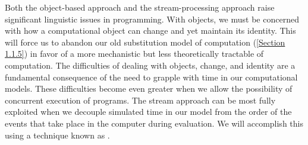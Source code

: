 Both the object-based approach and the stream-processing approach raise significant linguistic issues in programming.
With objects, we must be concerned with how a computational object can change and yet maintain its identity.
This will force us to abandon our old substitution model of computation (\cref{Section 1.1.5}) in favor of a more mechanistic but less theoretically tractable  of computation.
The difficulties of dealing with objects, change, and identity are a fundamental consequence of the need to grapple with time in our computational models.
These difficulties become even greater when we allow the possibility of concurrent execution of programs.
The stream approach can be most fully exploited when we decouple simulated time in our model from the order of the events that take place in the computer during evaluation.
We will accomplish this using a technique known as .







